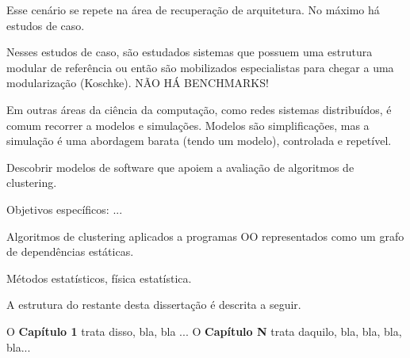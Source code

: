 Esse cenário se repete na área de recuperação de arquitetura. No máximo há estudos de caso.

Nesses estudos de caso, são estudados sistemas que possuem uma estrutura modular de referência ou então são mobilizados especialistas para chegar a uma modularização (Koschke). NÃO HÁ BENCHMARKS! %

Em outras áreas da ciência da computação, como redes sistemas distribuídos, é comum recorrer a modelos e simulações. Modelos são simplificações, mas a simulação é uma abordagem barata (tendo um modelo), controlada e repetível. %



Descobrir modelos de software que apoiem a avaliação de algoritmos de clustering.

Objetivos específicos:
 ...



Algoritmos de clustering aplicados a programas OO representados como um grafo de dependências estáticas.


Métodos estatísticos, física estatística.


A estrutura do restante desta dissertação é descrita a seguir.

O \textbf{Capítulo 1} trata disso, bla, bla
...
O \textbf{Capítulo N} trata daquilo, bla, bla, bla, bla...
